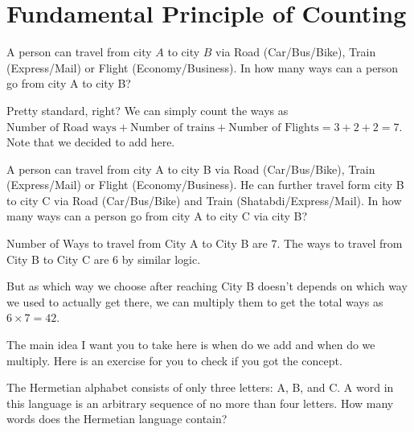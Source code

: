\section{Fundamental Principle of Counting}
\begin{example}
A person can travel from city $A$ to city $B$ via Road (Car/Bus/Bike), Train 
(Express/Mail) or Flight (Economy/Business). In how many ways can a person go from city A to city B?
\end{example}
Pretty standard, right? We can simply count the ways as $\text{Number of Road ways}
+\text{Number of trains}+\text{Number of Flights}=3+2+2=7$. Note that we decided to add here.
\begin{example}
    A person can travel from city A to city B via Road (Car/Bus/Bike), Train (Express/Mail) or
     Flight (Economy/Business). He can further travel form city B to city C via Road (Car/Bus/Bike) 
     and Train (Shatabdi/Express/Mail). In how many ways can a person go from city A to city C via city B?
\end{example}
Number of Ways to travel from City A to City B are $7$. The ways to travel from City B to City C are 
$6$ by similar logic.\par
But as which way we choose after reaching City B doesn't depends on which way we used to actually get 
there, we can multiply them to get the total ways as $6 \times 7=42$.\par
The main idea I want you to take here is when do we add and when do we multiply. Here is an exercise 
for you to check if you got the concept.
\begin{example}
The Hermetian alphabet consists of only three letters: A, B, and C. 
A word in this language is an arbitrary sequence of no more than four letters. 
How many words does the Hermetian language contain?
\end{example}
